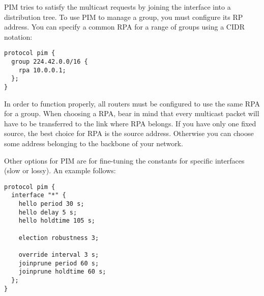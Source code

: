 PIM tries to satisfy the multicast requests by joining the interface into
a distribution tree. To use PIM to manage a group, you must configure its RP
address. You can specify a common RPA for a range of groups using a CIDR
notation:
\begin{lstlisting}
protocol pim {
  group 224.42.0.0/16 {
    rpa 10.0.0.1;
  };
}
\end{lstlisting}

\noindent In order to function properly, all routers must be configured to use the same
RPA for a group. When choosing a RPA, bear in mind that every multicast packet
will have to be transferred to the link where RPA belongs. If you have only one
fixed source, the best choice for RPA is the source address. Otherwise you can
choose some address belonging to the backbone of your network.

Other options for PIM are for fine-tuning the constants for specific
interfaces (slow or lossy). An example follows:

\begin{lstlisting}
protocol pim {
  interface "*" {
    hello period 30 s;
    hello delay 5 s;
    hello holdtime 105 s;

    election robustness 3;

    override interval 3 s;
    joinprune period 60 s;
    joinprune holdtime 60 s;
  };
}
\end{lstlisting}

